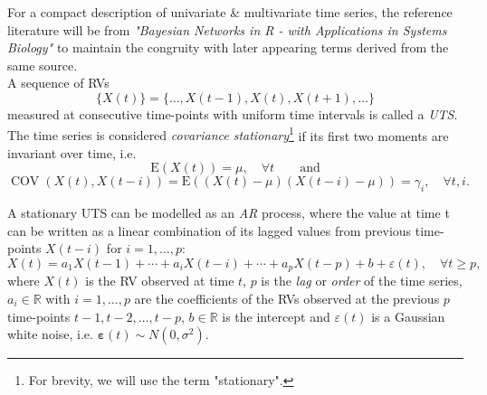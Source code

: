 
For a compact description of {univariate \& multivariate time series, the reference literature will be from \textit{"Bayesian Networks in R - with Applications in Systems Biology"} \citep{nagarajan2013bayesian} to maintain the congruity with later appearing terms derived from the same source.
\\

A sequence of \acp{RV} 
\begin{equation}
\{X(t)\}=\{\ldots, X(t-1), X(t), X(t+1), \ldots\}
\end{equation}
measured at consecutive time-points with uniform time intervals is called a \textit{\ac{UTS}}. The time series is considered \textit{covariance stationary}\footnote{For brevity, we will use the term "stationary".}} if its first two moments are invariant over time, i.e.
\begin{equation}
\mathrm{E}(X(t))=\mu, \quad \forall t \qquad \text{and}
\end{equation}
\begin{equation} \operatorname{COV}(X(t), X(t-i))=\mathrm{E}((X(t)-\mu)(X(t-i)-\mu))=\gamma_{i}, \quad \forall t, i.
\end{equation}

A stationary \ac{UTS} can be modelled as an \textit{\ac{AR}} process, where the value at time t can be written as a linear combination of its lagged values from previous time-points $X(t-i)$ for $i=1,\ldots,p$:
\begin{equation}
 X(t)=a_{1} X(t-1)+\cdots+a_{i} X(t-i)+\cdots+a_{p} X(t-p)+b+\varepsilon(t), \quad \forall t \geqslant p,
 \label{eq:univariate_ts}
\end{equation}
where $X(t)$ is the \ac{RV} observed at time $t$, $p$ is the \textit{lag} or \textit{order} of the time series, $a_{i} \in \mathbb{R}$ with $i=1, \ldots, p$ are the coefficients of the \acp{RV} observed at the previous $p$ time-points $t-1, t-2, \ldots, t-p$, $b \in \mathbb{R}$ is the intercept and $\varepsilon(t)$ is a Gaussian white noise, i.e. $\boldsymbol{\varepsilon}(t) \sim N\left(0, \sigma^{2}\right)$. 
\\

